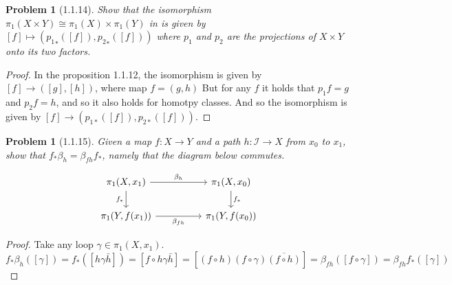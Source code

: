 \documentclass[11pt, a4paper, final]{amsart}
\newcommand{\unit}{\mathcal{I}}
\numberwithin{theorem}{section}
\newtheorem{problem}[theorem]{Problem}
\theoremstyle{definition}
\theoremstyle{remark}
\begin{document}
\begin{problem}[1.1.14]\label{problem: 1.1.14}
    Show that the isomorphism $\pi_1(X \times Y) \cong \pi_1(X) \times \pi_1(Y)$ in \cite[Proposition 1.12]{AH} is given by $[f] \mapsto ({p_1}_*([f]), {p_2}_*([f]))$ where $p_1$ and $p_2$ are the projections of $X \times Y$ onto its two factors.
\end{problem}

\begin{proof}
    In the proposition 1.1.12, the isomorphism is given by $[f] \to ([g], [h])$, where map $f = (g,h)$
    But for any $f$ it holds that $p_1 f  = g$ and $p_2 f = h$, and so it also holds for homotpy classes.
    And so the isomorphism is given by $[f] \to  (p_{1*}([f]), p_{2*}([f]))$.
\end{proof}


\begin{problem}[1.1.15]\label{problem: 1.1.15}
    Given a map $f:X \rightarrow Y$ and a path $h : \unit \rightarrow X$ from $x_0$ to $x_1$, show that $f_*\beta_h = \beta_{fh}f_*$, namely that the diagram below commutes.

    \[\begin{tikzcd}
	{\pi_1(X, x_1)} && {\pi_1(X, x_0)} \\
	{\pi_1(Y, f(x_1))} && {\pi_1(Y, f(x_0))}
	\arrow["{\beta_h}", from=1-1, to=1-3]
	\arrow["{f_*}"', from=1-1, to=2-1]
	\arrow["{f_*}", from=1-3, to=2-3]
	\arrow["{\beta_{fh}}"', from=2-1, to=2-3]
\end{tikzcd}\]
\end{problem}


\begin{proof}
    Take any loop $\gamma \in \pi_1(X, x_1)$.
    $$f_* \beta_h ([\gamma]) = f_*([h\gamma\bar{h}]) = [f\circ h\gamma\bar{h}] = [(f\circ h)(f \circ \gamma)\overline{(f \circ h)}] = \beta_{fh}([f \circ \gamma]) = \beta_{fh}f_*([\gamma])$$
\end{proof}
\end{document}
